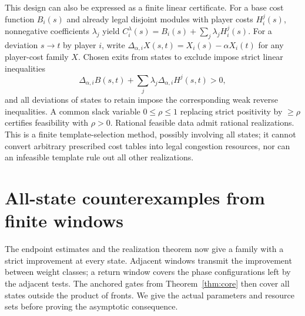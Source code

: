 \documentclass[manuscript,review,anonymous]{acmart}
\begin{document}
This design can also be expressed as a finite linear certificate. For a base cost function $B_i(s)$ and already legal disjoint modules with player costs $H_i^j(s)$, nonnegative coefficients $\lambda_j$ yield $C_i^\lambda(s)=B_i(s)+\sum_j\lambda_jH_i^j(s)$. For a deviation $s\to t$ by player $i$, write $\Delta_{\alpha,i}X(s,t)=X_i(s)-\alpha X_i(t)$ for any player-cost family $X$. Chosen exits from states to exclude impose strict linear inequalities
\[
 \Delta_{\alpha,i}B(s,t)+\sum_j\lambda_j\Delta_{\alpha,i}H^j(s,t)>0,
\]
and all deviations of states to retain impose the corresponding weak reverse inequalities. A common slack variable $0\le\rho\le1$ replacing strict positivity by $\ge\rho$ certifies feasibility with $\rho>0$. Rational feasible data admit rational realizations. This is a finite template-selection method, possibly involving all states; it cannot convert arbitrary prescribed cost tables into legal congestion resources, nor can an infeasible template rule out all other realizations.

\section{All-state counterexamples from finite windows}\label{sec:application}
The endpoint estimates and the realization theorem now give a family with a strict improvement at every state. Adjacent windows transmit the improvement between weight classes; a return window covers the phase configurations left by the adjacent tests. The anchored gates from Theorem~\ref{thm:core} then cover all states outside the product of fronts. We give the actual parameters and resource sets before proving the asymptotic consequence.
\end{document}
